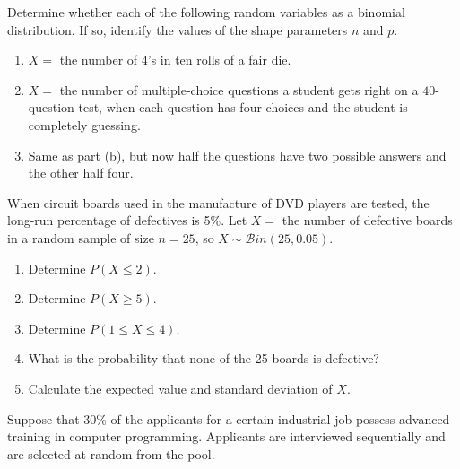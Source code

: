 \documentclass[12pt,reqno]{amsart}
\begin{document}
\bigskip

\prob Determine whether each of the following random variables as a binomial distribution. If so, identify the values of the shape parameters $n$ and $p$.

\medskip
\begin{enumerate}
\item $X=$ the number of $4$'s in ten rolls of a fair die.\vfill
\item $X=$ the number of multiple-choice questions a student gets right on a $40$-question test, when each question has four choices and the student is completely guessing.\vfill
\item Same as part (b), but now half the questions have two possible answers and the other half four.\vfill
\end{enumerate}











\bigskip
\prob When circuit boards used in the manufacture of DVD players are tested, the long-run percentage of defectives is 5\%. Let $X =$ the number of defective boards in a random sample of size $n = 25$, so $X \sim \mathcal{B}in(25, 0.05)$.

\medskip
\begin{enumerate}
\item Determine $P(X\leq 2)$.\vfill
\item Determine $P(X\geq 5)$.\vfill
\item Determine $P(1\leq X \leq 4)$.\vfill
\item What is the probability that none of the 25 boards is defective?\vfill
\item Calculate the expected value and standard deviation of $X$.\vfill
\end{enumerate}












\newpage
\prob Suppose that 30\% of the applicants for a certain industrial job possess advanced training in computer programming. Applicants are interviewed sequentially and are selected at random from the pool.
\end{document}
